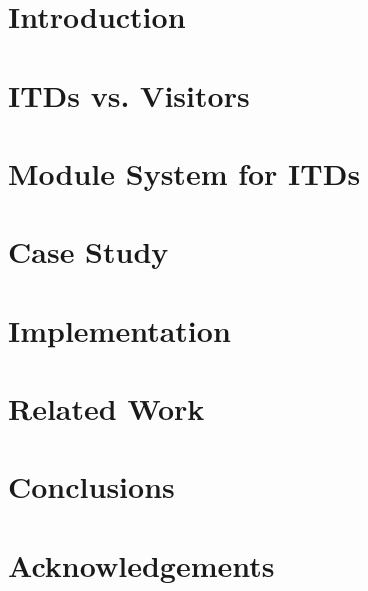 \documentclass{acm_proc_article-sp}
\begin{document}

\maketitle




\section{Introduction}
\label{section:introduction}


\section{ITDs vs. Visitors}
\label{section:itdvisitors}


\section{Module System for ITDs}
\label{section:jastaddmodules}


\section{Case Study}
\label{section:casestudy}


\section{Implementation}
\label{section:implementation}


\section{Related Work}
\label{section:related}


\section{Conclusions}
\label{section:conclusions}


\section{Acknowledgements}
\label{section:acknowledgements}

%

%
%
\end{document}
